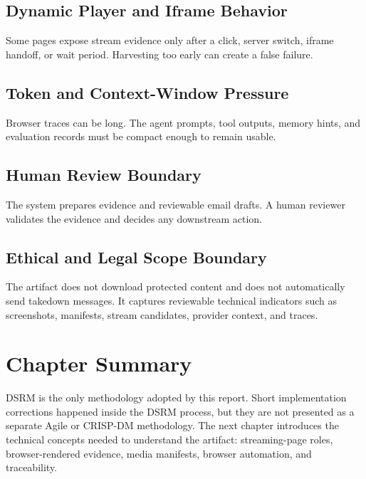 \subsection{Dynamic Player and Iframe Behavior}

Some pages expose stream evidence only after a click, server switch, iframe
handoff, or wait period. Harvesting too early can create a false failure.

\subsection{Token and Context-Window Pressure}

Browser traces can be long. The agent prompts, tool outputs, memory hints, and
evaluation records must be compact enough to remain usable.

\subsection{Human Review Boundary}

The system prepares evidence and reviewable email drafts. A human reviewer
validates the evidence and decides any downstream action.

\subsection{Ethical and Legal Scope Boundary}

The artifact does not download protected content and does not automatically
send takedown messages. It captures reviewable technical indicators such as
screenshots, manifests, stream candidates, provider context, and traces.

\section{Chapter Summary}

DSRM is the only methodology adopted by this report. Short implementation
corrections happened inside the DSRM process, but they are not presented as a
separate Agile or CRISP-DM methodology. The next chapter introduces the
technical concepts needed to understand the artifact: streaming-page roles,
browser-rendered evidence, media manifests, browser automation, and
traceability.
